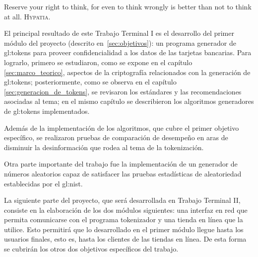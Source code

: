 %
%

{
  \epigrafe
  {%
    Reserve your right to think, for even to think wrongly is better than not to
    think at all.%
  }
  {%
    \textsc{Hypatia}.%
  }
}

\noindent
El principal resultado de este Trabajo Terminal I es el desarrollo del primer
módulo del proyecto (descrito en~\ref{sec:objetivos}): un programa generador de
\glspl{gl:token} para proveer confidencialidad a los datos de las tarjetas
bancarias. Para lograrlo, primero se estudiaron, como se expone en el capítulo
\ref{sec:marco_teorico}, aspectos de la criptografía relacionados con la
generación de \glspl{gl:token}; posteriormente, como se observa en el capítulo
\ref{sec:generacion_de_tokens}, se revisaron los estándares y las
recomendaciones asociadas al tema; en el mismo capítulo se describieron los
algoritmos generadores de \glspl{gl:token} implementados.

Además de la implementación de los algoritmos, que cubre el primer objetivo
específico, se realizaron pruebas de comparación de desempeño en aras de
disminuir la desinformación que rodea al tema de la tokenización.

Otra parte importante del trabajo fue la implementación de un generador de
números aleatorios capaz de satisfacer las pruebas estadísticas de aleatoriedad
establecidas por el \gls{gl:nist}\footnotemark.


La siguiente parte del proyecto, que será desarrollada en Trabajo Terminal II,
consiste en la elaboración de los dos módulos siguientes: una interfaz en red
que permita comunicarse con el programa tokenizador y una tienda en línea que la
utilice. Esto permitirá que lo desarrollado en el primer módulo llegue hasta los
usuarios finales, esto es, hasta los clientes de las tiendas en línea.
De esta forma se cubrirán los otros dos objetivos específicos del trabajo.
